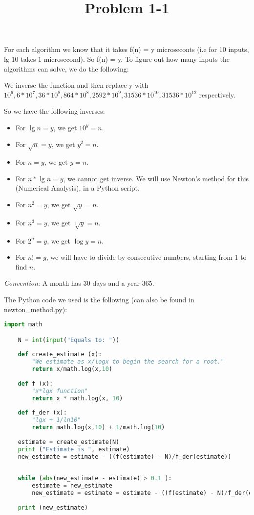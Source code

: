 \documentclass{article}
\title{Problem 1-1}
\begin{document}
\date{}
\author{}

\maketitle

For each algorithm we know that it takes f(n) = y microseconts (i.e for 10 inputs, lg 10 takes 1 microsecond).
So f(n) = y.
To figure out how many inputs the algorithms can solve, we do the following:

We inverse the function and then replace y with 
$10^{6}, 6 * 10^{7}, 36 * 10^{8}, 864 * 10^{8}, 2592 * 10^{9}, 31536 * 10^{10}, 31536 * 10^{12}$ respectively.

So we have the following inverses:

\begin{itemize}
    \item For $\lg{n} = y$, we get $10^y = n$.
    \item For $\sqrt{n} = y$, we get $y^{2} = n$.
    \item For $n = y$, we get $y = n$.
    \item For $n*\lg{n} = y$, we cannot get inverse. We will use Newton's method for this (Numerical Analysis), in a Python script.
    \item For $n^{2} = y$, we get $\sqrt{y} = n$.
    \item For $n^{3} = y$, we get $\sqrt[3]{y} = n$.
    \item For $2^{n} = y$, we get $\log{y} = n$.
    \item For $n! = y$, we will have to divide by consecutive numbers, starting from 1 to find $n$.
    
\end{itemize}


\textit{Convention:} A month has 30 days and a year 365.

The Python code we used is the following (can also be found in newton\_method.py):

\begin{lstlisting}[language=Python]
    import math

    N = int(input("Equals to: "))
    
    def create_estimate (x):
        "We estimate as x/logx to begin the search for a root."
        return x/math.log(x,10)
    
    def f (x):
        "x*lgx function"
        return x * math.log(x, 10)
    
    def f_der (x):
        "lgx + 1/ln10"
        return math.log(x,10) + 1/math.log(10)
    
    estimate = create_estimate(N)
    print ("Estimate is ", estimate)
    new_estimate = estimate - ((f(estimate) - N)/f_der(estimate))
    
    
    while (abs(new_estimate - estimate) > 0.1 ):
        estimate = new_estimate
        new_estimate = estimate = estimate - ((f(estimate) - N)/f_der(estimate))
    
    print (new_estimate)
    
\end{lstlisting}
\end{document}
